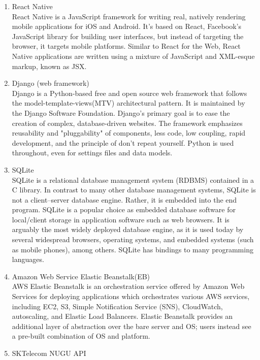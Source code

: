 \documentclass[conference]{IEEEtran}
\begin{document}
\begin{enumerate}
    \item React Native\\
    React Native is a JavaScript framework for writing real, natively rendering mobile applications for iOS and Android. It’s based on React, Facebook’s JavaScript library for building user interfaces, but instead of targeting the browser, it targets mobile platforms. Similar to React for the Web, React Native applications are written using a mixture of JavaScript and XML-esque markup, known as JSX.\\
    \item Django (web framework)\\
    Django is a Python-based free and open source web framework that follows the model-template-views(MTV) architectural pattern. It is maintained by the Django Software Foundation. Django's primary goal is to ease the creation of complex, database-driven websites. The framework emphasizes reusability and "pluggability" of components, less code, low coupling, rapid development, and the principle of don't repeat yourself. Python is used throughout, even for settings files and data models.\\
    \item SQLite\\SQLite is a relational database management system (RDBMS) contained in a C library. In contrast to many other database management systems, SQLite is not a client–server database engine. Rather, it is embedded into the end program. SQLite is a popular choice as embedded database software for local/client storage in application software such as web browsers. It is arguably the most widely deployed database engine, as it is used today by several widespread browsers, operating systems, and embedded systems (such as mobile phones), among others. SQLite has bindings to many programming languages.\\
    \item Amazon Web Service Elastic Beanstalk(EB)\\
    AWS Elastic Beanstalk is an orchestration service offered by Amazon Web Services for deploying applications which orchestrates various AWS services, including EC2, S3, Simple Notification Service (SNS), CloudWatch, autoscaling, and Elastic Load Balancers. Elastic Beanstalk provides an additional layer of abstraction over the bare server and OS; users instead see a pre-built combination of OS and platform.\\
    \item SKTelecom NUGU API\\

\end{enumerate}
\end{document}
